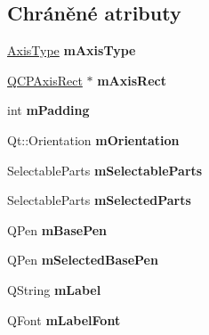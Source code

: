 \subsection*{Chráněné atributy}
\begin{DoxyCompactItemize}
\item 
\hypertarget{classQCPAxis_ae704bf9f2c2b026f08dd4ccad79c616e}{}\hyperlink{classQCPAxis_ae2bcc1728b382f10f064612b368bc18a}{Axis\+Type} {\bfseries m\+Axis\+Type}\label{classQCPAxis_ae704bf9f2c2b026f08dd4ccad79c616e}

\item 
\hypertarget{classQCPAxis_a6f150b65a202f32936997960e331dfcb}{}\hyperlink{classQCPAxisRect}{Q\+C\+P\+Axis\+Rect} $\ast$ {\bfseries m\+Axis\+Rect}\label{classQCPAxis_a6f150b65a202f32936997960e331dfcb}

\item 
\hypertarget{classQCPAxis_a52a805a4f03231210e0880db7f77e098}{}int {\bfseries m\+Padding}\label{classQCPAxis_a52a805a4f03231210e0880db7f77e098}

\item 
\hypertarget{classQCPAxis_a048e1792fa86f4f86df55200b3f0be36}{}Qt\+::\+Orientation {\bfseries m\+Orientation}\label{classQCPAxis_a048e1792fa86f4f86df55200b3f0be36}

\item 
\hypertarget{classQCPAxis_ab9042d8a095998f27a28b39411d8b9c3}{}Selectable\+Parts {\bfseries m\+Selectable\+Parts}\label{classQCPAxis_ab9042d8a095998f27a28b39411d8b9c3}

\item 
\hypertarget{classQCPAxis_a8f1eb0abfe2ae64652aa46b360e841e4}{}Selectable\+Parts {\bfseries m\+Selected\+Parts}\label{classQCPAxis_a8f1eb0abfe2ae64652aa46b360e841e4}

\item 
\hypertarget{classQCPAxis_ad6b4a0aee9558fb35529e960b8fef72d}{}Q\+Pen {\bfseries m\+Base\+Pen}\label{classQCPAxis_ad6b4a0aee9558fb35529e960b8fef72d}

\item 
\hypertarget{classQCPAxis_a80baa4e3c16f9b6edf3eccacd2a50fde}{}Q\+Pen {\bfseries m\+Selected\+Base\+Pen}\label{classQCPAxis_a80baa4e3c16f9b6edf3eccacd2a50fde}

\item 
\hypertarget{classQCPAxis_ae8001dbdfc47685c1cf7b98b044460e6}{}Q\+String {\bfseries m\+Label}\label{classQCPAxis_ae8001dbdfc47685c1cf7b98b044460e6}

\item 
\hypertarget{classQCPAxis_a37442d470e30e19b81ecaf979a34d046}{}Q\+Font {\bfseries m\+Label\+Font}\label{classQCPAxis_a37442d470e30e19b81ecaf979a34d046}


\end{DoxyCompactItemize}
